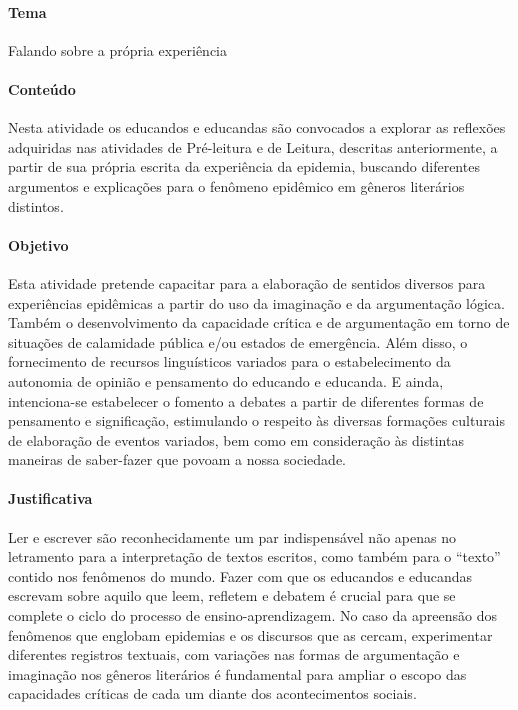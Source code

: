\documentclass[12pt]{extarticle}
\begin{document}
\paragraph{Tema} Falando sobre a própria experiência

\paragraph{Conteúdo}

Nesta atividade os educandos e educandas são convocados a explorar as
reflexões adquiridas nas atividades de Pré-leitura e de Leitura,
descritas anteriormente, a partir de sua própria escrita da experiência
da epidemia, buscando diferentes argumentos e explicações para o
fenômeno epidêmico em gêneros literários distintos.

\paragraph{Objetivo}

Esta atividade pretende capacitar para a elaboração de sentidos diversos
para experiências epidêmicas a partir do uso da imaginação e da
argumentação lógica. Também o desenvolvimento da capacidade crítica e de
argumentação em torno de situações de calamidade pública e/ou estados de
emergência. Além disso, o fornecimento de recursos linguísticos variados
para o estabelecimento da autonomia de opinião e pensamento do educando
e educanda. E ainda, intenciona-se estabelecer o fomento a debates a
partir de diferentes formas de pensamento e significação, estimulando o
respeito às diversas formações culturais de elaboração de eventos
variados, bem como em consideração às distintas maneiras de saber-fazer
que povoam a nossa sociedade.

\paragraph{Justificativa}

Ler e escrever são reconhecidamente um par indispensável não apenas no
letramento para a interpretação de textos escritos, como também para o
``texto'' contido nos fenômenos do mundo. Fazer com que os educandos e
educandas escrevam sobre aquilo que leem, refletem e debatem é crucial
para que se complete o ciclo do processo de ensino-aprendizagem. No caso
da apreensão dos fenômenos que englobam epidemias e os discursos que as
cercam, experimentar diferentes registros textuais, com variações nas
formas de argumentação e imaginação nos gêneros literários é fundamental
para ampliar o escopo das capacidades críticas de cada um diante dos
acontecimentos sociais.
\end{document}
